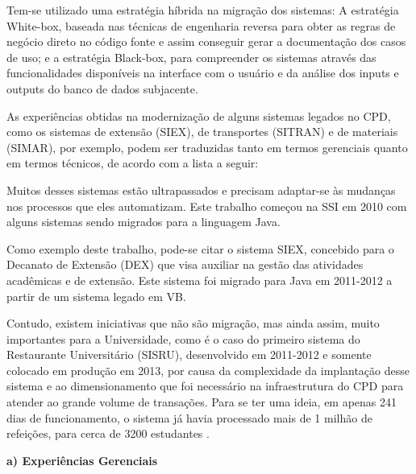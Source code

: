 Tem-se utilizado uma estratégia híbrida na migração dos sistemas: A estratégia White-box, baseada nas técnicas de engenharia reversa para obter as regras de negócio direto no código fonte e assim conseguir gerar a documentação dos casos de uso; e a estratégia Black-box, para compreender os sistemas através das funcionalidades disponíveis na interface com o usuário e da análise dos inputs e outputs do banco de dados subjacente. 

As experiências obtidas na modernização de alguns sistemas legados no CPD, como os sistemas de extensão (SIEX), de transportes (SITRAN) e de materiais (SIMAR), por exemplo, podem ser traduzidas tanto em termos gerenciais quanto em termos técnicos, de acordo com a lista a seguir:

Muitos desses sistemas estão ultrapassados e precisam adaptar-se às mudanças nos 
processos que eles automatizam. Este trabalho começou na \acrshort{SSI} em 2010 com alguns 
sistemas sendo migrados para a linguagem Java. 

Como exemplo deste trabalho, pode-se citar o sistema \acrshort{SIEX}, 
concebido para o Decanato de Extensão (DEX) que visa auxiliar na gestão das 
atividades acadêmicas e de extensão. Este sistema foi migrado para Java
em 2011-2012 a partir de um sistema legado em VB. 

Contudo, existem iniciativas que não são migração, mas ainda assim, 
muito importantes para a Universidade, como é o caso do primeiro sistema do 
Restaurante Universitário (\acrshort{SISRU}), 
desenvolvido em 2011-2012 e somente colocado 
em produção em 2013, por causa da complexidade da implantação desse sistema 
e ao dimensionamento que foi necessário na infraestrutura do \acrshort{CPD} para atender ao 
grande volume de transações. Para se ter uma ideia, em apenas 241 dias de funcionamento, 
o sistema já havia processado mais de 1 milhão de refeições, para cerca 
de 3200 estudantes \cite{PortalRU:2015}. 

\vspace{0.2cm} 

\textbf{a) Experiências Gerenciais}

\vspace{0.2cm} 

